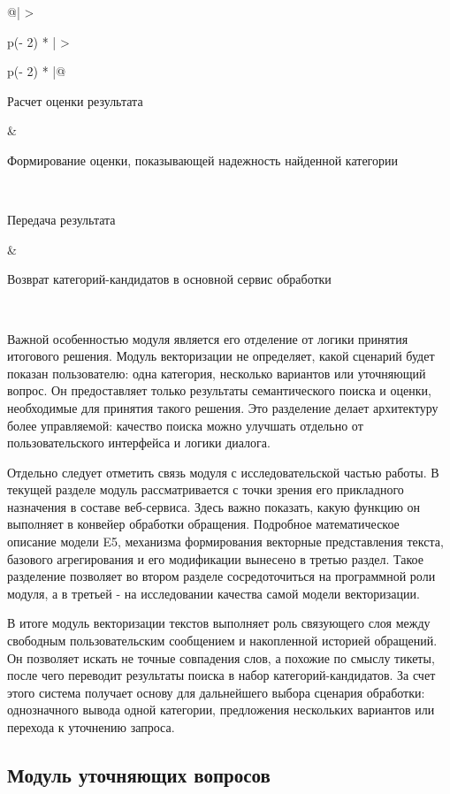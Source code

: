 \documentclass[14pt,a4paper]{extarticle}
\numberwithin{figure}{section}
\numberwithin{table}{section}
\begin{document}
\begin{longtable}[]{@{}|
  >{\raggedright\arraybackslash}p{(\columnwidth - 2\tabcolsep) * }|
  >{\raggedright\arraybackslash}p{(\columnwidth - 2\tabcolsep) * }|@{}}
\begin{minipage}[t]{\linewidth}\raggedright
Расчет оценки результата
\end{minipage} & \begin{minipage}[t]{\linewidth}\raggedright
Формирование оценки, показывающей надежность найденной категории
\end{minipage} \\ \hline
\begin{minipage}[t]{\linewidth}\raggedright
Передача результата
\end{minipage} & \begin{minipage}[t]{\linewidth}\raggedright
Возврат категорий-кандидатов в основной сервис обработки
\end{minipage} \\ \hline
\end{longtable}

Важной особенностью модуля является его отделение от логики принятия
итогового решения. Модуль векторизации не определяет, какой сценарий
будет показан пользователю: одна категория, несколько вариантов или
уточняющий вопрос. Он предоставляет только результаты семантического
поиска и оценки, необходимые для принятия такого решения. Это разделение
делает архитектуру более управляемой: качество поиска можно улучшать
отдельно от пользовательского интерфейса и логики диалога.

Отдельно следует отметить связь модуля с исследовательской частью
работы. В текущей разделе модуль рассматривается с точки зрения его
прикладного назначения в составе веб-сервиса. Здесь важно показать,
какую функцию он выполняет в конвейер обработки обращения. Подробное
математическое описание модели E5, механизма формирования векторные представления текста, базового агрегирования и его модификации вынесено в третью раздел.
Такое разделение позволяет во втором разделе сосредоточиться на
программной роли модуля, а в третьей - на исследовании качества самой
модели векторизации.

В итоге модуль векторизации текстов выполняет роль связующего слоя между
свободным пользовательским сообщением и накопленной историей обращений.
Он позволяет искать не точные совпадения слов, а похожие по смыслу
тикеты, после чего переводит результаты поиска в набор
категорий-кандидатов. За счет этого система получает основу для
дальнейшего выбора сценария обработки: однозначного вывода одной
категории, предложения нескольких вариантов или перехода к уточнению
запроса.

\subsection{Модуль уточняющих
вопросов}
\end{document}
